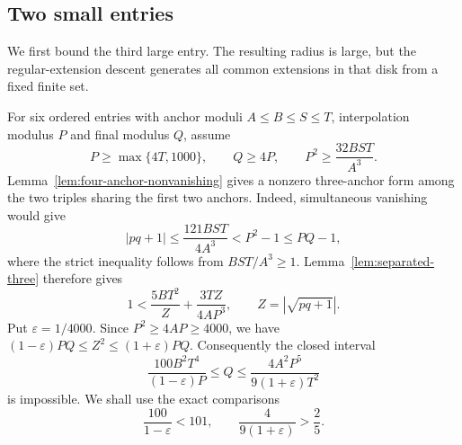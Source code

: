 \documentclass[12pt]{article}
\numberwithin{equation}{section}
\begin{document}
\subsection{Two small entries}

We first bound the third large entry. The resulting radius is large, but the regular-extension descent generates all common extensions in that disk from a fixed finite set.

For six ordered entries with anchor moduli $A\le B\le S\le T$, interpolation modulus $P$ and final modulus $Q$, assume
\begin{equation}\label{sm:six-V-hypotheses}
 P\ge\max\{4T,1000\},\qquad Q\ge4P,
 \qquad P^2\ge\frac{32BST}{A^3}.
\end{equation}
Lemma~\ref{lem:four-anchor-nonvanishing} gives a nonzero three-anchor form among the two triples sharing the first two anchors. Indeed, simultaneous vanishing would give
\begin{equation*}
 |pq+1|\le\frac{121BST}{4A^3}
 <P^2-1\le PQ-1,
\end{equation*}
where the strict inequality follows from $BST/A^3\ge1$.
Lemma~\ref{lem:separated-three} therefore gives
\begin{equation*}
 1<\frac{5BT^2}{Z}+\frac{3TZ}{4AP^3},
 \qquad Z=|\sqrt{pq+1}|.
\end{equation*}
Put $\varepsilon=1/4000$. Since $P^2\ge4AP\ge4000$, we have
$(1-\varepsilon)PQ\le Z^2\le(1+\varepsilon)PQ$.
Consequently the closed interval
\begin{equation}\label{sm:six-V-interval}
 \frac{100B^2T^4}{(1-\varepsilon)P}\le Q
 \le\frac{4A^2P^5}{9(1+\varepsilon)T^2}
\end{equation}
is impossible. We shall use the exact comparisons
\begin{equation}\label{sm:six-V-constants}
 \frac{100}{1-\varepsilon}<101,
 \qquad \frac4{9(1+\varepsilon)}>\frac25.
\end{equation}
\end{document}

